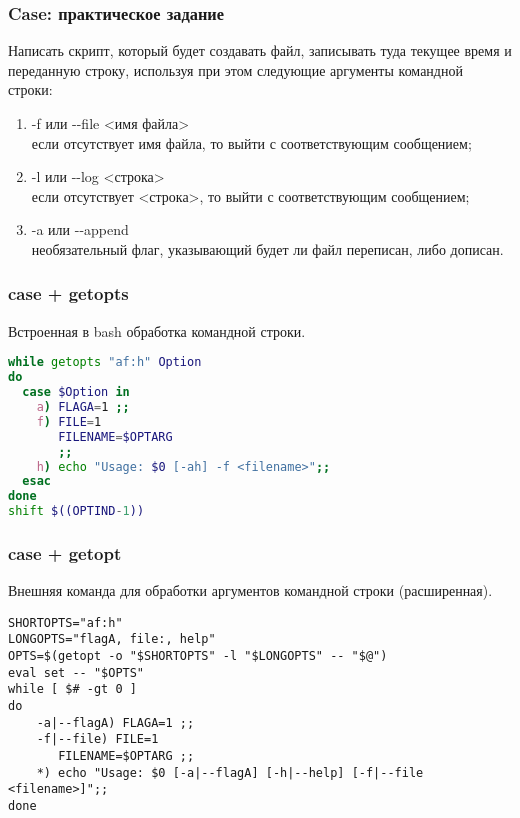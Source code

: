 \begin{frame}
	\frametitle{Case: практическое задание}

	Написать скрипт, который будет создавать файл, 
	записывать туда текущее время и переданную строку,
	используя при этом следующие аргументы командной строки: 

	\begin{enumerate}
		\item -f или -{}-file <имя файла>\\
			если отсутствует имя файла, то выйти с соответствующим сообщением;
		\item -l или -{}-log <строка>\\
			если отсутствует <строка>, то выйти с соответствующим сообщением;
		\item -a или -{}-append \\
			необязательный флаг, указывающий будет ли файл переписан, либо дописан.
	\end{enumerate}

\end{frame}

\begin{frame}[fragile]
	\frametitle{case + getopts}
	
	Встроенная в bash обработка командной строки.

\begin{lstlisting}[language=sh,frame=single]
while getopts "af:h" Option
do
  case $Option in 
    a) FLAGA=1 ;;
    f) FILE=1
       FILENAME=$OPTARG
       ;;
    h) echo "Usage: $0 [-ah] -f <filename>";;
  esac  
done
shift $((OPTIND-1))
\end{lstlisting}
\end{frame}

\begin{frame}[fragile]
\frametitle{case + getopt}
	
	Внешняя команда для обработки аргументов командной строки (расширенная).

	\small
	\begin{lstlisting}
SHORTOPTS="af:h"
LONGOPTS="flagA, file:, help"
OPTS=$(getopt -o "$SHORTOPTS" -l "$LONGOPTS" -- "$@")
eval set -- "$OPTS"
while [ $# -gt 0 ]
do
    -a|--flagA) FLAGA=1 ;;
    -f|--file) FILE=1
       FILENAME=$OPTARG ;;
    *) echo "Usage: $0 [-a|--flagA] [-h|--help] [-f|--file <filename>]";;
done
	\end{lstlisting}

\end{frame}

